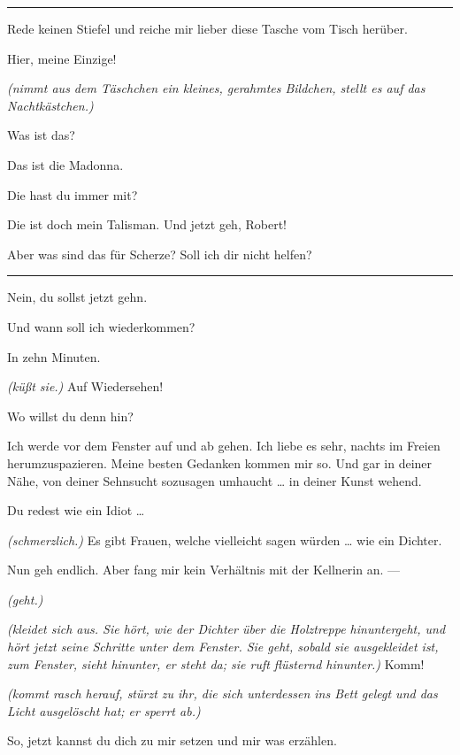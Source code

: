 \documentclass[
	final,
	a4paper,
	ngerman,
	mpinclude = true, %
	twoside = true,
	open = right,
	cleardoublepage = plain,
	DIV = 13,
	BCOR = 1cm,
	titlepage = firstiscover,
	]{scrbook}
\newcommand{\direction}[1]{\textit{(#1)}}
\newenvironment{deletion}{%
		\vspace{0.25\baselineskip}
		\hrule
		\vspace{0.25\baselineskip}
		\color{darkgray}
	}{
		\color{black}
		\vspace{0.25\baselineskip}
		\hrule 
		\vspace{0.25\baselineskip}
	}
\newcommand{\thecharacter}[1]{\textup{\textsc{#1}}\xspace}
\newcommand{\thedichter}{\thecharacter{Robert Bibitz}}
\newcommand{\theschauspielerin}{\thecharacter{Daniela}}
\newcommand{\character}[1]{\item[#1:]}
\newcommand{\dichter}{\character{\thedichter}}
\newcommand{\schauspielerin}{\character{\theschauspielerin}}
\begin{document}
\begin{play}
	\begin{deletion}
	\schauspielerin
	Rede keinen Stiefel und reiche mir lieber diese Tasche vom Tisch herüber.

	\dichter
	Hier, meine Einzige!

	\schauspielerin
	\direction{nimmt aus dem Täschchen ein kleines, gerahmtes Bildchen, stellt es auf das Nachtkästchen.}

	\dichter
	Was ist das?

	\schauspielerin
	Das ist die Madonna.

	\dichter
	Die hast du immer mit?

	\schauspielerin
	Die ist doch mein Talisman. Und jetzt geh, Robert!

	\dichter
	Aber was sind das für Scherze? Soll ich dir nicht helfen?
	\end{deletion}

	\schauspielerin
	Nein, du sollst jetzt gehn.

	\dichter
	Und wann soll ich wiederkommen?

	\schauspielerin
	In zehn Minuten.

	\dichter
	\direction{küßt sie.} Auf Wiedersehen!

	\schauspielerin
	Wo willst du denn hin?

	\dichter
	Ich werde vor dem Fenster auf und ab gehen. Ich liebe es sehr, nachts im Freien herumzuspazieren. Meine besten Gedanken kommen mir so. Und gar in deiner Nähe, von deiner Sehnsucht sozusagen umhaucht \ldots{} in deiner Kunst wehend.

	\schauspielerin
	Du redest wie ein Idiot \ldots{}

	\dichter
	\direction{schmerzlich.} Es gibt Frauen, welche vielleicht sagen würden \ldots{} wie ein Dichter.

	\schauspielerin
	Nun geh endlich. Aber fang mir kein Verhältnis mit der Kellnerin an. ---

	\dichter
	\direction{geht.}

	\schauspielerin
	\direction{kleidet sich aus. Sie hört, wie der Dichter über die Holztreppe hinuntergeht, und hört jetzt seine Schritte unter dem Fenster. Sie geht, sobald sie ausgekleidet ist, zum Fenster, sieht hinunter, er steht da; sie ruft flüsternd hinunter.} Komm!

	\dichter
	\direction{kommt rasch herauf, stürzt zu ihr, die sich unterdessen ins Bett gelegt und das Licht ausgelöscht hat; er sperrt ab.}

	\schauspielerin
	So, jetzt kannst du dich zu mir setzen und mir was erzählen.


\end{play}
\end{document}

